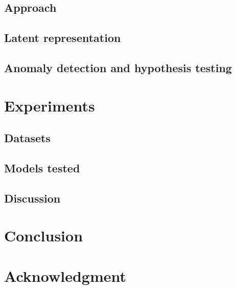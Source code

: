 \documentclass{article}
\begin{document}
\subsection{Approach}

\subsection{Latent representation}

\subsection{Anomaly detection and hypothesis testing}

\section{Experiments}

\subsection{Datasets}

\subsection{Models tested}

\subsection{Discussion}

\section{Conclusion}

\section{Acknowledgment}

%
%
\end{document}
